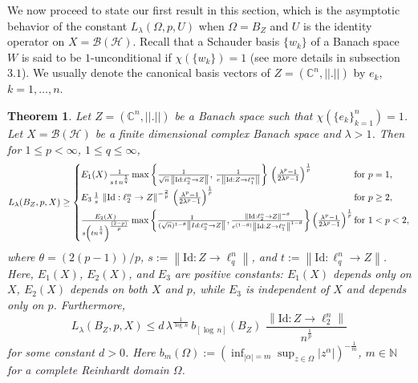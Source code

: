 \documentclass[a4paper,11pt, reqno]{amsart}
\newtheorem{thm}{Theorem}[section]
\theoremstyle{definition}
\newcommand{\norm}[1]{\left\lVert#1\right\rVert}
\begin{document}
	 We now proceed to state our first result in this section, which is the asymptotic behavior of the constant $L_{\lambda}(\Omega, p,U)$ when $\Omega=B_{Z}$ and $U$ is the identity operator on $X=\mathcal{B}(\mathcal{H})$. Recall that a Schauder basis $\{w_{k}\}$ of a Banach space $W$ is said to be $1$-unconditional if $\chi(\{w_k\})=1$ (see more details in subsection $3.1$). We usually denote the canonical basis vectors of $Z=(\mathbb{C}^n, ||.||)$ by $e_{k}$, $k=1, \ldots,n$. 
	\begin{thm} \label{thm-1.2}
		Let $Z=(\mathbb{C}^n, ||.||)$ be a Banach space such that $\chi(\{e_k\}^n_{k=1})=1$. Let $X=\mathcal{B}(\mathcal{H})$ be a finite dimensional complex Banach space and $\lambda>1$. Then for $1 \leq p < \infty$, $1 \leq q \leq \infty$,
		\begin{equation*}
			L_{\lambda}(B_{Z}, p,X) \geq	\begin{cases}
				E_{1}(X)\,\frac{1}{s\,t\, n^{\frac{1}{q}}}  \max \left\{\frac{1}{\sqrt{n}\, \norm{\mathrm{Id}: \ell^n_{2} \rightarrow Z}}, \, \frac{1}{e\, \norm{\mathrm{Id}: Z \rightarrow \ell^n_{1}}}\right\}\, \left(\frac{\lambda^p -1}{2\lambda^p - 1}\right)^{\frac{1}{p}} & \text{for $p=1$}, \\[2mm]
				E_{3}\, \frac{1}{s}\,\norm{\mathrm{Id}:\ell^n _2 \rightarrow Z}^{-\frac{2}{p}}\, \left(\frac{\lambda^p -1}{2\lambda^p - 1}\right)^{\frac{1}{p}}\, & \text{for $p \geq 2$}, \\[2mm]
				
				\frac{E_{2}(X)}{s\left(t n^{\frac{1}{q}}\right)^{\frac{(2-p)}{p}}} \max \left\{\frac{1}{(\sqrt{n})^{1-\theta} \norm{Id: \ell^n_{2} \rightarrow Z}},  \frac{\norm{\mathrm{Id}:\ell^n _2 \rightarrow Z}^{-\theta}}{e^{(1-\theta)} \norm{\mathrm{Id}: Z \rightarrow \ell^n_{1}}^{1-\theta}}\right\}\left(\frac{\lambda^p -1}{2\lambda^p - 1}\right)^{\frac{1}{p}} \hspace{-3mm} & \text{for $1<p< 2$}, 
			\end{cases}
		\end{equation*}
		where $\theta = (2(p-1))/p$, $s:=\norm{\mathrm{Id}: Z \rightarrow \ell^n_q}$, and $t:=\norm{\mathrm{Id}:  \ell^n_q\rightarrow Z}$. Here, $E_{1}(X)$, $E_{2}(X)$, and $E_{3}$ are positive constants: $E_{1}(X)$ depends only on $X$, $E_{2}(X)$ depends on both $X$ and $p$, while $E_{3}$ is independent of $X$ and depends only on $p$. Furthermore,
		\begin{equation*}
			L_{\lambda}(B_{Z}, p,X) \leq d\,\lambda^{\frac{1}{\log \,n}}\,b_{[\log\,n]}(B_Z)\, \,\frac{\norm{\mathrm{Id}:Z \rightarrow \ell^n_2}}{n^{\frac{1}{p}}}
		\end{equation*}
		for some constant $d>0$. Here $b_m(\Omega):=\left(\inf_{|\alpha|=m}\sup_{z \in \Omega} |z^{\alpha}|\right)^{-\frac{1}{m}}$, $m \in \mathbb{N}$ for a complete Reinhardt domain $\Omega$.
	\end{thm}
\end{document}
